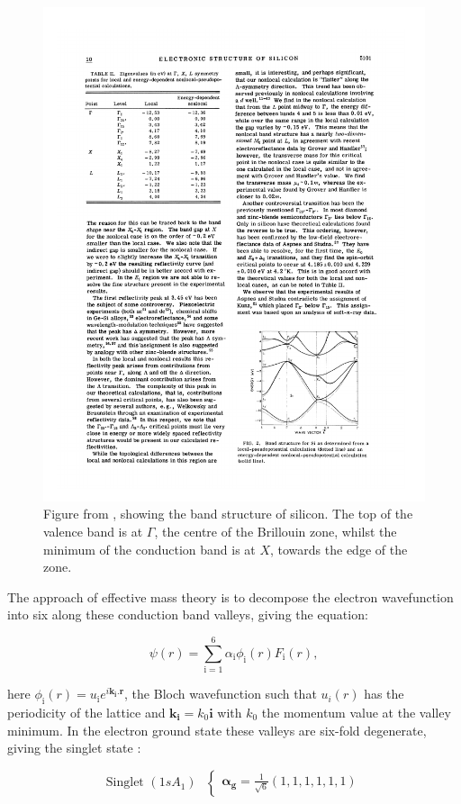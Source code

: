 \begin{figure}
\centering
\includegraphics[width = 0.75\columnwidth]{Figures/siliconBandStructure.pdf}
\caption[Silicon band structure]{Figure from \cite{Chelikowsky1974}, showing the band structure of silicon. The top of the valence band is at $\Gamma$, the centre of the Brillouin zone, whilst the minimum of the conduction band is at $X$, towards the edge of the zone.}
\label{fig:siliconband}
\end{figure}

The approach of effective mass theory is to decompose the electron wavefunction into six along these conduction band valleys, giving the equation:

\begin{equation}
\psi(r) = \sum_{\text{i}=1}^6{\alpha_\text{i}\phi_\text{i}(r)F_\text{i}(r)},
\end{equation}

here $\phi_\text{i}(r) = u_\text{i} e^{i \bm{k_\text{i}.r}}$, the Bloch wavefunction such that $u_i(r)$ has the periodicity of the lattice and $\bm{k_\text{i}}=k_0\bm{\text{i}}$ with $k_0$ the momentum value at the valley minimum.
In the electron ground state these valleys are six-fold degenerate, giving the singlet state \cite{Smit2004}:

\begin{equation}
\text{Singlet  } (1sA_{1}) \text{  }
\begin{cases}
\bm{\alpha_g} = \frac{1}{\sqrt{6}}(1, 1, 1, 1, 1, 1)
\end{cases}
\end{equation}

